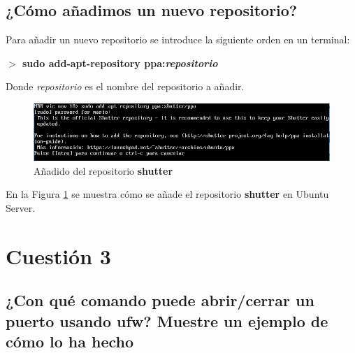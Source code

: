 \subsection{¿Cómo añadimos un nuevo repositorio?}

Para añadir un nuevo repositorio se introduce la siguiente orden en un terminal\cite{enlace10,enlace11}: 

\begin{center}
	\textbf{$ > $ sudo add-apt-repository ppa:\textit{repositorio}}
\end{center}

Donde \textit{repositorio} es el nombre del repositorio a añadir.
\begin{figure}[H] %
	\centering
	\includegraphics[scale=0.7]{figuras/figura8.png} 
	\caption{Añadido del repositorio \textbf{shutter}} 
	\label{fig:figura8}
\end{figure}

En la Figura \ref{fig:figura8} se muestra cómo se añade el repositorio \textbf{shutter} en Ubuntu Server.

\newpage


\section{Cuestión 3}
\subsection{¿Con qué comando puede abrir/cerrar un puerto usando
	ufw? Muestre un ejemplo de cómo lo ha hecho}

